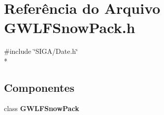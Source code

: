 \section{Referência do Arquivo G\+W\+L\+F\+Snow\+Pack.\+h}
\label{_g_w_l_f_snow_pack_8h}
{\ttfamily \#include \char`\"{}S\+I\+G\+A/\+Date.\+h\char`\"{}}\\*
\subsection*{Componentes}
\begin{DoxyCompactItemize}
\item 
class {\bf G\+W\+L\+F\+Snow\+Pack}
\end{DoxyCompactItemize}
